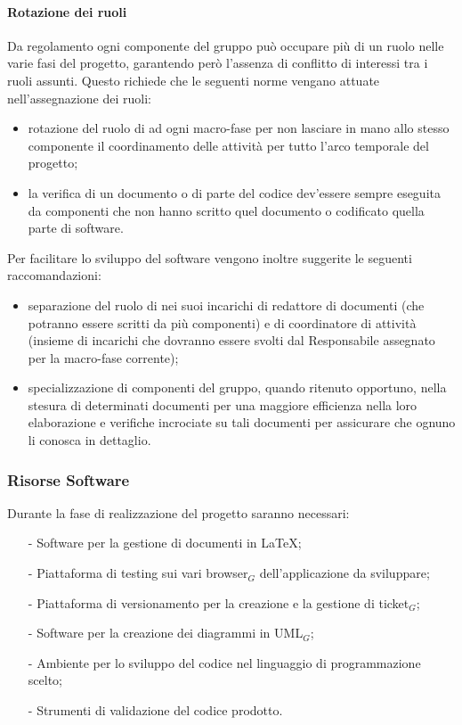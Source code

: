 \paragraph{Rotazione dei ruoli\\}
Da regolamento\cite{docorganigramma} ogni componente del gruppo può occupare più di un ruolo nelle varie fasi del progetto, garantendo però l'assenza di conflitto di interessi tra i ruoli assunti. Questo richiede che le seguenti norme vengano attuate nell'assegnazione dei ruoli:
\begin{itemize}
\item rotazione del ruolo di \ruoloResponsabile{} ad ogni macro-fase per non lasciare in mano allo stesso componente il coordinamento delle attività per tutto l'arco temporale del progetto;
\item la verifica di un documento o di parte del codice dev'essere sempre eseguita da componenti che non hanno scritto quel documento o codificato quella parte di software.
\end{itemize}
Per facilitare lo sviluppo del software vengono inoltre suggerite le seguenti raccomandazioni:
\begin{itemize}
\item separazione del ruolo di \ruoloResponsabile{} nei suoi incarichi di redattore di documenti (che potranno essere scritti da più componenti) e di coordinatore di attività (insieme di incarichi che dovranno essere svolti dal Responsabile assegnato per la macro-fase corrente);
\item specializzazione di componenti del gruppo, quando ritenuto opportuno, nella stesura di determinati documenti per una maggiore efficienza nella loro elaborazione e verifiche incrociate su tali documenti per assicurare che ognuno li conosca in dettaglio.
\end{itemize}

\subsubsection{Risorse Software}
Durante la fase di realizzazione del progetto saranno necessari:
\begin{itemize}
	\item[-] Software per la gestione di documenti in \LaTeX;
	\item[-] Piattaforma di testing sui vari browser$_G$ dell'applicazione da sviluppare;
	\item[-] Piattaforma di versionamento per la creazione e la gestione di ticket$_G$;
	\item[-] Software per la creazione dei diagrammi in UML$_G$;
	\item[-] Ambiente per lo sviluppo del codice nel linguaggio di programmazione scelto;
	\item[-] Strumenti di validazione del codice prodotto.
\end{itemize}


